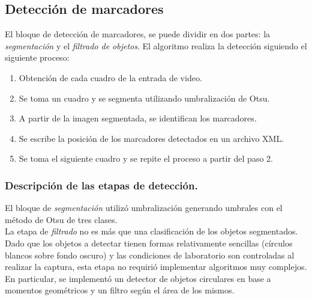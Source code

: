 \subsection{Detección de marcadores}
El bloque de detección de marcadores, se puede dividir en dos partes: la \textit{segmentación} y el \textit{filtrado de objetos}.
%
El algoritmo realiza la detección siguiendo el siguiente proceso:
%
\begin{enumerate}
  \item Obtención de cada cuadro de la entrada de video.
  \item Se toma un cuadro y se segmenta utilizando umbralización de Otsu.
  \item A partir de la imagen segmentada, se identifican los marcadores.
  \item Se escribe la posición de los marcadores detectados en un archivo XML.
  \item Se toma el siguiente cuadro y se repite el proceso a partir del paso 2.
\end{enumerate}
%
\subsubsection{Descripción de las etapas de detección.}
El bloque de \textit{segmentación} utilizó umbralización generando umbrales con el método de Otsu\cite{otsu} de tres clases.\\
%
La etapa de \textit{filtrado} no es más que una clasificación de los objetos segmentados. Dado que los objetos a detectar tienen formas relativamente sencillas (círculos blancos sobre fondo oscuro) y las condiciones de laboratorio son controladas al realizar la captura, esta etapa no requirió implementar algoritmos muy complejos. En particular, se implementó un detector de objetos circulares en base a momentos geométricos\cite{imageMoments} y un filtro según el área de los mismos.
%
